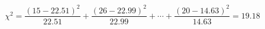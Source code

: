 

\[
\chi^2 = \frac{(15 - 22.51)^2}{22.51} + \frac{(26-22.99)^2}{22.99} + \cdots + \frac{(20 - 14.63)^2}{14.63} = 19.18
\]


